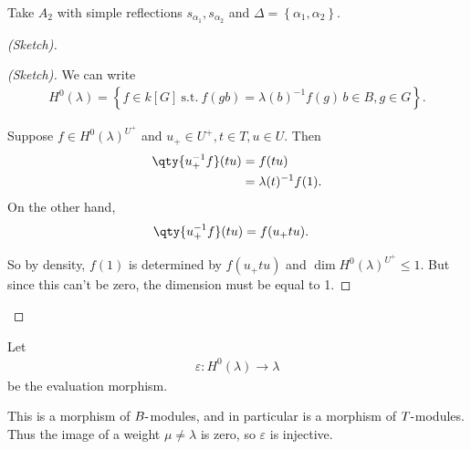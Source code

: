 \begin{example}

\begin{example}

Take \(A_2\) with simple reflections \(s_{\alpha_1}, s_{\alpha_2}\) and
\(\Delta = \left\{{\alpha_1, \alpha_2}\right\}\).

\begin{center}
\end{center}

\end{example}

\end{example}

\begin{proof}[(Sketch)]

\begin{proof}[(Sketch)]

We can write
\begin{align*}   H^0(\lambda) = \left\{{f\in k[G] ~{\text{s.t.}}~f(gb) = \lambda(b)^{-1} f(g) \, b\in B, g\in G}\right\} .\end{align*}

Suppose \(f\in H^0(\lambda)^{U^+}\) and \(u_+ \in U^+, t\in T, u\in U\).
Then
\begin{align*}   \qty{ u_+^{-1} f} (tu)  &= f(tu) \\ &= \lambda(t)^{-1} f(1) .\end{align*}
On the other hand,
\begin{align*}   \qty{ u_+^{-1} f} (tu)  &= f(u_+ t u) .\end{align*}

So by density, \(f(1)\) is determined by \(f(u_+ t u)\) and
\(\dim H^0(\lambda)^{U^+} \leq 1\). But since this can't be zero, the
dimension must be equal to 1.

\end{proof}

\end{proof}

\begin{proposition}[?]

\begin{proposition}[?]

Let \begin{align*}   \varepsilon: H^0(\lambda) \to \lambda \end{align*}
be the evaluation morphism.

This is a morphism of \(B{\hbox{-}}\)modules, and in particular is a
morphism of \(T{\hbox{-}}\)modules. Thus the image of a weight
\(\mu \neq \lambda\) is zero, so \(\varepsilon\) is injective.

\end{proposition}

\end{proposition}

